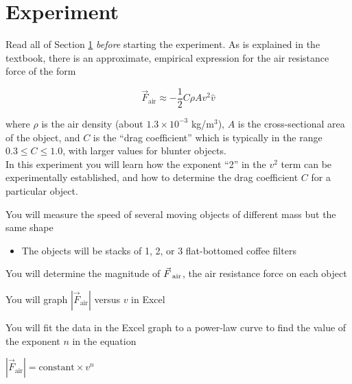 \documentclass[11pt]{article}
\begin{document}
\begin{center}
{}
\end{center}


\section{Experiment} \label{sec_exp}

Read all of Section \ref{sec_exp} \emph{before} starting the experiment. As is explained in the textbook, there is an approximate, empirical expression for the air resistance force of the form

\vspace*{-8pt}
$$\vec{F}_\text{air} \approx -\frac12 C \rho A v^2 \hat{v}$$

where $\rho$ is the air density (about $1.3 \times 10^{-3}$ kg/m$^3$), $A$ is the cross-sectional area of the object, and $C$ is the ``drag coefficient'' which is typically in the range $0.3 \leq C \leq 1.0$, with larger values for blunter objects.\\

In this experiment you will learn how the exponent ``2'' in the $v^2$ term can be experimentally established, and how to determine the drag coefficient $C$ for a particular object.\\

\begin{compactitem}[\color{MIBlue}$\bullet$]
\item You will measure the speed of several moving objects of different mass but the same shape
\begin{itemize}
\item The objects will be stacks of 1, 2, or 3 flat-bottomed coffee filters
\end{itemize}
\item You will determine the magnitude of $\vec{F}_{\text{ \text{air}}}$, the air resistance force on each object
\item You will graph $\left|\vec{F}_{ \text{air}}\right|$ versus $v$ in Excel
\item You will fit the data in the Excel graph to a power-law curve to find the value of the exponent $n$ in the equation
\end{compactitem}

\vspace*{-8pt}
\begin{center}
$\left|\vec{F}_{ \text{air}}\right| = \mathrm{constant} \times v^n$
\end{center}
\end{document}
